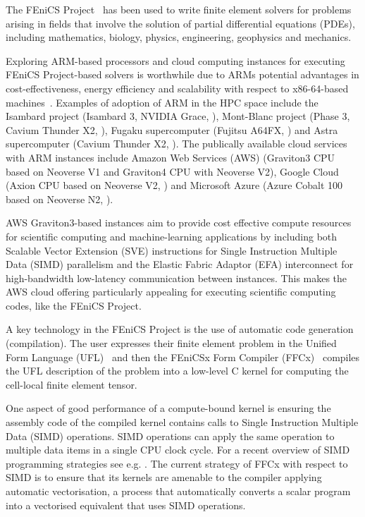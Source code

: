 The FEniCS Project~\citep{alnaes2015fenics,baratta_dolfinx_2023} has been used
to write finite element solvers for problems arising in fields that involve the
solution of partial differential equations (PDEs), including mathematics,
biology, physics, engineering, geophysics and mechanics.

Exploring ARM-based processors and cloud computing instances for executing
FEniCS Project-based solvers is worthwhile due to ARMs potential advantages in
cost-effectiveness, energy efficiency and scalability with respect to
x86-64-based machines~\cite{simakov_are_2023,suarez_comprehensive_2024}.
Examples of adoption of ARM in the HPC space include the Isambard project
(Isambard 3, NVIDIA Grace, \citep{isambard}), Mont-Blanc project (Phase 3,
Cavium Thunder X2, \citep{Rajovic2016}), Fugaku supercomputer (Fujitsu A64FX,
\citep{fugaku}) and Astra supercomputer (Cavium Thunder X2, \citep{astra}). The
publically available cloud services with ARM instances include Amazon Web
Services (AWS) (Graviton3 CPU based on Neoverse V1 and Graviton4 CPU with
Neoverse V2), Google Cloud (Axion CPU based on Neoverse V2,
\citep{google_arm_compute}) and Microsoft Azure (Azure Cobalt 100 based on
Neoverse N2, \citep{microsoft_azure}).

AWS Graviton3-based instances aim to provide cost effective compute resources
for scientific computing and machine-learning applications by including both
Scalable Vector Extension (SVE) instructions for Single Instruction Multiple
Data (SIMD) parallelism and the Elastic Fabric Adaptor (EFA) interconnect for
high-bandwidth low-latency communication between instances. This makes the AWS
cloud offering particularly appealing for executing scientific computing codes,
like the FEniCS Project.

A key technology in the FEniCS Project is the use of automatic code generation
(compilation). The user expresses their finite element problem in the Unified
Form Language (UFL)~\citep{alnaes_unified_2014} and then the FEniCSx Form
Compiler (FFCx)~\citep{kirby_compiler_2006} compiles the UFL description of the
problem into a low-level C kernel for computing the cell-local finite element
tensor.

One aspect of good performance of a compute-bound kernel is ensuring the
assembly code of the compiled kernel contains calls to Single Instruction
Multiple Data (SIMD) operations. SIMD operations can apply the same operation
to multiple data items in a single CPU clock cycle. For a recent overview of
SIMD programming strategies see e.g. \citep{rocke_evaluation_2023}. The current
strategy of FFCx with respect to SIMD is to ensure that its kernels are
amenable to the compiler applying automatic vectorisation, a process that
automatically converts a scalar program into a vectorised equivalent that uses
SIMD operations.
 
